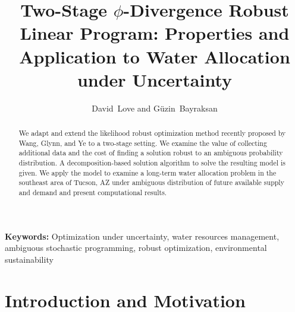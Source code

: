 \documentclass[11pt]{article}
\author{David~Love and G\"{u}zin~Bayraksan}
\title{Two-Stage $\phi$-Divergence Robust Linear Program: Properties and Application to Water Allocation under Uncertainty}
\date{}
\newcommand{\keywords}[1]{\par\noindent\enspace\ignorespaces\textbf{Keywords:} #1}
\begin{document}
\maketitle

\begin{abstract}
	We adapt and extend the likelihood robust optimization method recently proposed by Wang, Glynn, and Ye to a two-stage setting.
	We examine the value of collecting additional data and the cost of finding a solution robust to an ambiguous probability distribution.
	A decomposition-based solution algorithm to solve the resulting model is given.
	We apply the model to examine a long-term water allocation problem in the southeast area of Tucson, AZ under ambiguous distribution of future available supply and demand and present computational results.
\end{abstract}

\keywords{Optimization under uncertainty, water resources management,  ambiguous stochastic programming, robust optimization, environmental sustainability}

\section{Introduction and Motivation}

 
\end{document}
